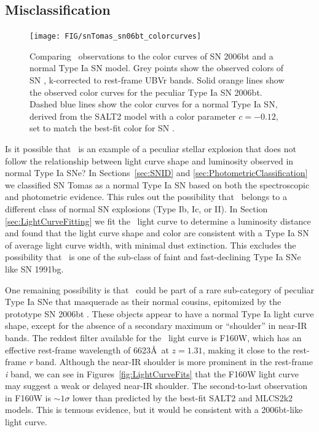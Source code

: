\subsection{Misclassification}
\label{sec:Misclassification}

\begin{figure}
\begin{center}
\texttt{[image: FIG/snTomas\_sn06bt\_colorcurves]}
\caption{ 
Comparing \tomas\ observations to the color curves of SN 2006bt and a
normal Type Ia SN model. Grey points show the observed colors of
SN \tomas, k-corrected to rest-frame UBVr bands. Solid orange lines
show the observed color curves for the peculiar Type Ia SN
2006bt. Dashed blue lines show the color curves for a normal Type Ia
SN, derived from the SALT2 model with a color parameter $c=-0.12$, set
to match the best-fit color for SN \tomas.
\label{fig:colorcomparison} }
\end{center}
\end{figure}

Is it possible that \tomas\ is an example of a peculiar stellar
explosion that does not follow the relationship between light curve
shape and luminosity observed in normal Type Ia SNe?  In
Sections~\ref{sec:SNID} and \ref{sec:PhotometricClassification} we
classified SN Tomas as a normal Type Ia SN based on both the
spectroscopic and photometric evidence.  This rules out the
possibility that \tomas\ belongs to a different class of normal SN
explosions (Type Ib, Ic, or II). In
Section \ref{sec:LightCurveFitting} we fit the \tomas\ light curve to
determine a luminosity distance and found that the light curve shape
and color are consistent with a Type Ia SN of average light curve
width, with minimal dust extinction.  This excludes the possibility
that \tomas\ is one of the sub-class of faint and fast-declining Type
Ia SNe like SN 1991bg.

One remaining possibility is that \tomas\ could be part of a rare
sub-category of peculiar Type Ia SNe that masquerade as their normal
cousins, epitomized by the prototype SN 2006bt \citep{Foley:2010}.
These objects appear to have a normal Type Ia light curve shape,
except for the absence of a secondary maximum or ``shoulder'' in
near-IR bands.  The reddest filter available for the \tomas\ light
curve is F160W, which has an effective rest-frame wavelength of
6623\AA\ at $z=1.31$, making it close to the rest-frame {\it r} band.
Although the near-IR shoulder is more prominent in the rest-frame {\it
i} band, we can see in Figures~\ref{fig:LightCurveFits} that the F160W
light curve may suggest a weak or delayed near-IR shoulder.  The
second-to-last observation in F160W is $\sim1\sigma$ lower than
predicted by the best-fit SALT2 and MLCS2k2 models. This is tenuous
evidence, but it would be consistent with a 2006bt-like light curve.


